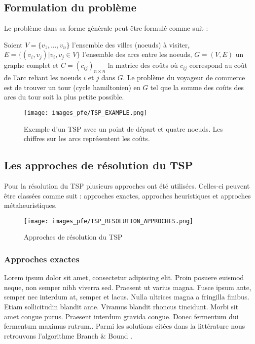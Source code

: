 \subsection{Formulation du problème}
Le problème dans sa forme générale peut être formulé comme suit :

\medskip
Soient $ V = \{v_1,...,v_n\} $ l'ensemble des villes (noeuds) à visiter, $ E = \{ (v_i,v_j) | v_i,v_j \in V \}$ l'ensemble des arcs entre les noeuds, $G = (V,E)$ un graphe complet et $C = (c_{ij})_{n × n}$ la matrice des coûts où $c_{ij}$ correspond au coût de l'arc reliant les noeuds $i$ et $j$ dans $G$. Le problème du voyageur de commerce est de trouver un tour (cycle hamiltonien) en $G$ tel que la somme des coûts des arcs du tour soit la plus petite possible.

\medskip

\begin{figure}[hbt!]
  \centering
  \texttt{[image: images\_pfe/TSP\_EXAMPLE.png]}
  \caption{Exemple d'un TSP avec un point de départ et quatre noeuds. Les chiffres sur les arcs représentent les coûts.}
  \label{fig:tsp-example}
\end{figure}
\FloatBarrier

\subsection{Les approches de résolution du TSP}

Pour la résolution du TSP plusieurs approches ont été utilisées. Celles-ci peuvent être classées comme suit : approches exactes, approches heuristiques et approches métaheuristiques.

\medskip

\begin{figure}[hbt!]
  \centering
  \texttt{[image: images\_pfe/TSP\_RESOLUTION\_APPROCHES.png]}
  \caption{Approches de résolution du TSP}
  \label{fig:tsp-solutions}
\end{figure}
\FloatBarrier

\medskip

\subsubsection{Approches exactes}
Lorem ipsum dolor sit amet, consectetur adipiscing elit. Proin posuere euismod neque, non semper nibh viverra sed. Praesent ut varius magna. Fusce ipsum ante, semper nec interdum at, semper et lacus. Nulla ultrices magna a fringilla finibus. Etiam sollicitudin blandit ante. Vivamus blandit rhoncus tincidunt. Morbi sit amet congue purus. Praesent interdum gravida congue. Donec fermentum dui fermentum maximus rutrum.. Parmi les solutions citées dans la littérature nous retrouvons l'algorithme Branch \& Bound \parencite{diderich_solving_1996,cotta_hybridizing_1995, tschoke_solving_1995}.

